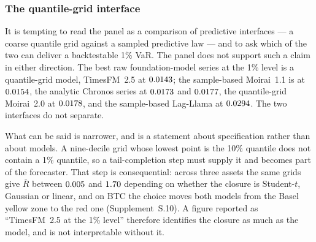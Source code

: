 \documentclass[preprint,11pt,authoryear]{elsarticle}
\newcommand{\1}{\boldsymbol{1}}
\begin{document}
\subsubsection{The quantile-grid interface}
\label{sec:interface_failure}

It is tempting to read the panel as a comparison of predictive interfaces --- a
coarse quantile grid against a sampled predictive law --- and to ask which of the
two can deliver a backtestable 1\% VaR. The panel does not support such a claim
in either direction.
The best raw foundation-model series at the 1\% level is a quantile-grid model,
TimesFM~2.5 at $0.0143$; the sample-based Moirai~1.1 is at
$0.0154$, the analytic Chronos series at $0.0173$ and
$0.0177$, the quantile-grid Moirai~2.0 at $0.0178$, and
the sample-based Lag-Llama at $0.0294$. The two interfaces do not
separate.

What can be said is narrower, and is a statement about specification rather than
about models. A nine-decile grid whose lowest point is the 10\% quantile does
not contain a 1\% quantile, so a tail-completion step must supply it and becomes
part of the forecaster. That step is consequential: across three assets the same
grids give $\bar R$ between $0.005$ and $1.70$ depending on whether the closure is
Student-$t$, Gaussian or linear, and on BTC the choice moves both models from
the Basel yellow zone to the red one (Supplement~S.10). A figure reported as
``TimesFM~2.5 at the 1\% level'' therefore identifies the closure as much as the
model, and is not interpretable without it.
\end{document}
